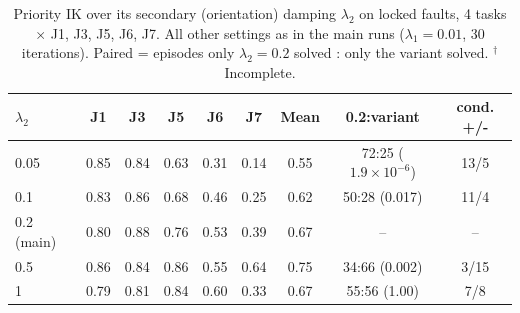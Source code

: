 \begin{table}[t]
\centering
\caption{Priority IK over its secondary (orientation) damping $\lambda_2$ on locked faults, 4 tasks $\times$ J1, J3, J5, J6, J7. All other settings as in the main runs ($\lambda_1 = 0.01$, 30 iterations). Paired = episodes only $\lambda_2{=}0.2$ solved : only the variant solved. $^\dagger$Incomplete.}
\label{tab:prio_lam2}
\setlength{\tabcolsep}{3pt}
\begin{tabular}{lcccccccc}
\toprule
$\lambda_2$ & J1 & J3 & J5 & J6 & J7 & Mean & 0.2:variant & cond. +/- \\
\midrule
0.05 & 0.85 & 0.84 & 0.63 & 0.31 & 0.14 & 0.55 & 72:25 ($1.9\times10^{-6}$) & 13/5 \\
0.1 & 0.83 & 0.86 & 0.68 & 0.46 & 0.25 & 0.62 & 50:28 (0.017) & 11/4 \\
0.2 (main) & 0.80 & 0.88 & 0.76 & 0.53 & 0.39 & 0.67 & -- & -- \\
0.5 & 0.86 & 0.84 & 0.86 & 0.55 & 0.64 & 0.75 & 34:66 (0.002) & 3/15 \\
1 & 0.79 & 0.81 & 0.84 & 0.60 & 0.33 & 0.67 & 55:56 (1.00) & 7/8 \\
\bottomrule
\end{tabular}
\end{table}
